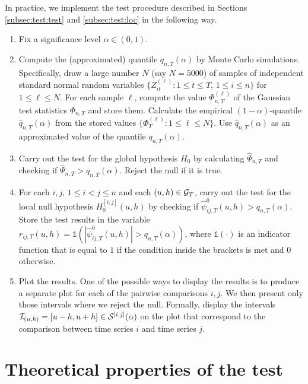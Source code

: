 \documentclass[a4paper,12pt]{article}
\begin{document}
In practice, we implement the test procedure described in Sections \ref{subsec:test:test} and \ref{subsec:test:loc} in the following way. 
\begin{enumerate}[label=\textit{Step \arabic*.}, leftmargin=1.45cm]
\item Fix a significance level $\alpha \in (0, 1)$. 
\item Compute the (approximated) quantile $q_{n, T}(\alpha)$ by Monte Carlo simulations. Specifically, draw a large number $N$ (say $N=5000$) of samples of independent standard normal random variables $\{Z_{it}^{(\ell)} : 1 \le t \le T, \, 1 \le i \le n \}$ for $1 \le \ell \le N$. For each sample $\ell$, compute the value $\Phi_{n,T}^{(\ell)}$ of the Gaussian test statistics $\Phi_{n, T}$ and store them. Calculate the empirical $(1-\alpha)$-quantile $\hat{q}_{n, T}(\alpha)$ from the stored values $\{ \Phi_T^{(\ell)}: 1 \le \ell \le N \}$. Use $\hat{q}_{n, T}(\alpha)$ as an approximated value of the quantile $q_{n, T}(\alpha)$.
\item Carry out the test for the global hypothesis $H_0$ by calculating $\widehat{\Psi}_{n, T}$ and checking if $\widehat{\Psi}_{n, T} > q_{n, T}(\alpha)$. Reject the null if it is true.
\item For each $i, j,\, 1 \le i < j \le n$ and each $(u, h) \in \mathcal{G}_T$, carry out the test for the local null hypothesis $H_0^{[i, j]}(u, h)$ by checking if $\hat{\psi}^0_{ij, T}(u, h)> q_{n, T}(\alpha)$. Store the test results in the variable $r_{ij,T}(u, h) = \mathds{1}( |\hat{\psi}_{ij,T}^0(u, h)| > q_{n, T}(\alpha))$, where $\mathds{1}(\cdot)$ is an indicator function that is equal to $1$ if the condition inside the brackets is met and $0$ otherwise.
\item Plot the results. One of the possible ways to display the results is to produce a separate plot for each of the pairwise comparisons $i, j$. We then present only those intervals where we reject the null. Formally, display the intervals $\mathcal{I}_{(u, h)} = [u- h, u+h] \in \mathcal{S}^{[i, j]}(\alpha)$ on the plot that correspond to the comparison between time series $i$ and time series $j$. 
\end{enumerate}



\section{Theoretical properties of the test}\label{sec:theo}
\end{document}

